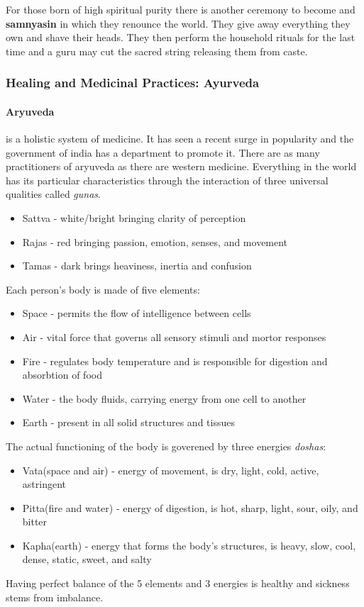 \documentclass{article}
\begin{document}
For those born of high spiritual purity there is another ceremony to become and \textbf{samnyasin} in which they renounce the world. They give away everything they own and shave their heads. They then perform the household rituals for the last time and a guru may cut the sacred string releasing them from caste.

\subsubsection*{Healing and Medicinal Practices: Ayurveda}
\label{ssub:healing_and_medicinal_practices_ayurveda}
\paragraph{Aryuveda}
\label{par:aryuveda}
is a holistic system of medicine. It has seen a recent surge in popularity and the government of india has a department to promote it. There are as many practitioners of aryuveda as there are western medicine. Everything in the world has its particular characteristics through the interaction of three universal qualities called \emph{gunas}.
\begin{itemize}
	\item Sattva - white/bright bringing clarity of perception
	\item Rajas - red bringing passion, emotion, senses, and movement
	\item Tamas - dark brings heaviness, inertia and confusion
\end{itemize}
Each person's body is made of five elements:
\begin{itemize}
	\item Space - permits the flow of intelligence between cells
	\item Air - vital force that governs all sensory stimuli and mortor responses
	\item Fire - regulates body temperature and is responsible for digestion and absorbtion of food
	\item Water - the body fluids, carrying energy from one cell to another
	\item Earth - present in all solid structures and tissues
\end{itemize}
The actual functioning of the body is goverened by three energies \emph{doshas}:
\begin{itemize}
	\item Vata(space and air) - energy of movement, is dry, light, cold, active, astringent
	\item Pitta(fire and water) - energy of digestion, is hot, sharp, light, sour, oily, and bitter
	\item Kapha(earth) - energy that forms the body's structures, is heavy, slow, cool, dense, static, sweet, and salty
\end{itemize}
Having perfect balance of the 5 elements and 3 energies is healthy and sickness stems from imbalance.
\end{document}
